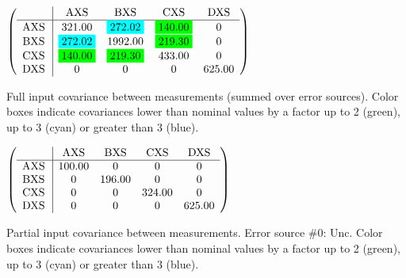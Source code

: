 \begin{table}[H]
\scriptsize
\begin{center}
\renewcommand{\arraystretch}{1.1}
\begin{math}\left(\begin{array}{c|cccc}
 & \mathrm{AXS} & 
\mathrm{BXS} & 
\mathrm{CXS} & 
\mathrm{DXS} \\
\hline
\mathrm{AXS} \hspace*{2pt} &     321.00 &  \colorbox{Cyan1}{$    272.02$} &  \colorbox{Green1}{$    140.00$} &  0 \\
\mathrm{BXS} \hspace*{2pt} &  \colorbox{Cyan1}{$    272.02$} &    1992.00 &  \colorbox{Green1}{$    219.30$} &  0 \\
\mathrm{CXS} \hspace*{2pt} &  \colorbox{Green1}{$    140.00$} &  \colorbox{Green1}{$    219.30$} &     433.00 &  0 \\
\mathrm{DXS} \hspace*{2pt} &  0 &  0 &  0 &     625.00 \\
\end{array}\right)\end{math}
\caption{Full input covariance between measurements (summed over error sources). Color boxes indicate covariances lower than nominal values by a factor up to 2 (green), up to 3 (cyan) or greater than 3 (blue).}
\renewcommand{\arraystretch}{1}
\end{center}
\end{table}
\begin{table}[H]
\scriptsize
\begin{center}
\renewcommand{\arraystretch}{1.1}
\begin{math}\left(\begin{array}{c|cccc}
 & \mathrm{AXS} & 
\mathrm{BXS} & 
\mathrm{CXS} & 
\mathrm{DXS} \\
\hline
\mathrm{AXS} \hspace*{2pt} &     100.00 &  0 &  0 &  0 \\
\mathrm{BXS} \hspace*{2pt} &  0 &     196.00 &  0 &  0 \\
\mathrm{CXS} \hspace*{2pt} &  0 &  0 &     324.00 &  0 \\
\mathrm{DXS} \hspace*{2pt} &  0 &  0 &  0 &     625.00 \\
\end{array}\right)\end{math}
\caption{Partial input covariance between measurements. Error source \#0: Unc. Color boxes indicate covariances lower than nominal values by a factor up to 2 (green), up to 3 (cyan) or greater than 3 (blue).}
\renewcommand{\arraystretch}{1}
\end{center}
\end{table}
